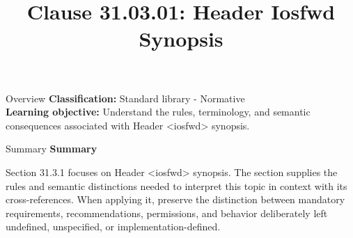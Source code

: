 \documentclass[10pt,letterpaper]{article}
\title{Clause 31.03.01: Header Iosfwd Synopsis}
\author{}
\date{}
\begin{document}
\maketitle
\begin{CornellOverviewBox}{Overview}
\textbf{Classification:} Standard library - Normative\\[2pt]
\textbf{Learning objective:} Understand the rules, terminology, and semantic consequences associated with Header <iosfwd> synopsis.
\end{CornellOverviewBox}\begin{CornellSummaryBox}{Summary}
{\sffamily\bfseries\color{Accent} Summary}\par\vspace{3pt}Section 31.3.1 focuses on Header <iosfwd> synopsis. The section supplies the rules and semantic distinctions needed to interpret this topic in context with its cross-references. When applying it, preserve the distinction between mandatory requirements, recommendations, permissions, and behavior deliberately left undefined, unspecified, or implementation-defined.
\end{CornellSummaryBox}
\end{document}
